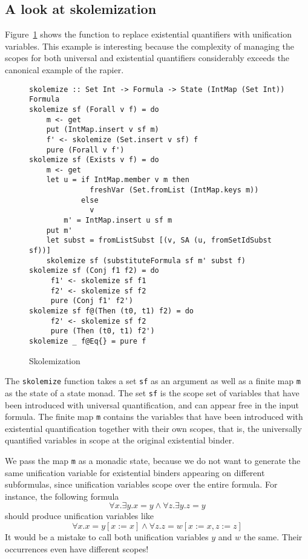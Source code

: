 \documentclass[sigconf]{acmart}
\newcommand{\tc}[1]{{\small\texttt{#1}}}
\begin{document}
\subsection{A look at skolemization}
\label{sec:skolemize}

Figure~\ref{skolemization} shows the function to replace existential quantifiers
with unification variables. This example is interesting because the complexity of
managing the scopes for both universal and existential quantifiers
considerably exceeds the canonical example of the rapier.

\begin{figure}
\begin{verbatim}
skolemize :: Set Int -> Formula -> State (IntMap (Set Int)) Formula
skolemize sf (Forall v f) = do
    m <- get
    put (IntMap.insert v sf m)
    f' <- skolemize (Set.insert v sf) f
    pure (Forall v f')
skolemize sf (Exists v f) = do
    m <- get
    let u = if IntMap.member v m then
              freshVar (Set.fromList (IntMap.keys m))
            else
              v
        m' = IntMap.insert u sf m
    put m'
    let subst = fromListSubst [(v, SA (u, fromSetIdSubst sf))]
    skolemize sf (substituteFormula sf m' subst f)
skolemize sf (Conj f1 f2) = do
     f1' <- skolemize sf f1
     f2' <- skolemize sf f2
     pure (Conj f1' f2')
skolemize sf f@(Then (t0, t1) f2) = do
     f2' <- skolemize sf f2
     pure (Then (t0, t1) f2')
skolemize _ f@Eq{} = pure f
\end{verbatim}
\caption{Skolemization}
\label{skolemization}
\end{figure}

The \tc{skolemize} function takes a set \tc{sf} as an argument as well as a
finite map \tc{m} as the state of a state monad. The set \tc{sf} is the scope set
of variables that have been
introduced with universal quantification, and can appear free in the
input formula. The finite map \tc{m} contains the variables
that have been introduced with existential quantification together with their own
scopes, that is, the universally quantified variables in scope at the original existential
binder.

We pass the map \tc{m} as a monadic state, because we do not
want to generate the same unification variable for existential binders appearing
on different subformulas, since unification variables scope over the entire formula. For instance, the following formula
$$\forall x. \exists y. x = y \land \forall z. \exists y. z = y$$
should produce unification variables like
$$\forall x. x = y[x:=x] \land \forall z. z = w[x:=x, z:=z]$$
It would be a mistake to call both unification variables $y$ and $w$ the same.
Their occurrences even have different scopes!
\end{document}
